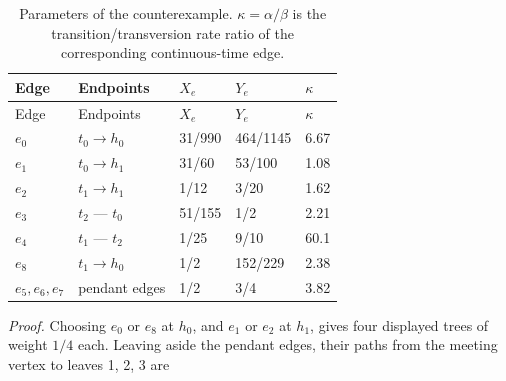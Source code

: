 \documentclass[
  11pt,
]{article}
\begin{document}
\begin{longtable}[]{@{}lllll@{}}
\caption{Parameters of the counterexample. \(\kappa=\alpha/\beta\) is
the transition/transversion rate ratio of the corresponding
continuous-time edge.}\tabularnewline
\toprule\noalign{}
Edge & Endpoints & \(X_e\) & \(Y_e\) & \(\kappa\) \\
\midrule\noalign{}
\endfirsthead
\toprule\noalign{}
Edge & Endpoints & \(X_e\) & \(Y_e\) & \(\kappa\) \\
\midrule\noalign{}
\endhead
\bottomrule\noalign{}
\endlastfoot
\(e_0\) & \(t_0 \to h_0\) & 31/990 & 464/1145 & 6.67 \\
\(e_1\) & \(t_0 \to h_1\) & 31/60 & 53/100 & 1.08 \\
\(e_2\) & \(t_1 \to h_1\) & 1/12 & 3/20 & 1.62 \\
\(e_3\) & \(t_2\) --- \(t_0\) & 51/155 & 1/2 & 2.21 \\
\(e_4\) & \(t_1\) --- \(t_2\) & 1/25 & 9/10 & 60.1 \\
\(e_8\) & \(t_1 \to h_0\) & 1/2 & 152/229 & 2.38 \\
\(e_5, e_6, e_7\) & pendant edges & 1/2 & 3/4 & 3.82 \\
\end{longtable}

\emph{Proof.} Choosing \(e_0\) or \(e_8\) at \(h_0\), and \(e_1\) or
\(e_2\) at \(h_1\), gives four displayed trees of weight \(1/4\) each.
Leaving aside the pendant edges, their paths from the meeting vertex to
leaves 1, 2, 3 are
\end{document}
